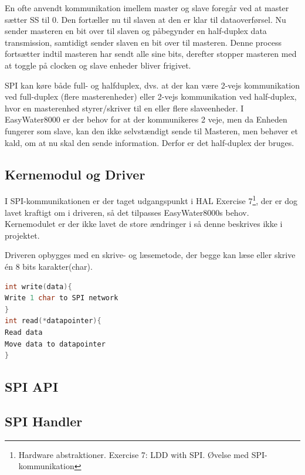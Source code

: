 En ofte anvendt kommunikation imellem master og slave foregår ved at master sætter SS til 0. Den fortæller nu til slaven at den er klar til 
dataoverførsel. Nu sender masteren en bit over til slaven og påbegynder en half-duplex data transmission, samtidigt sender slaven en bit over til masteren. Denne process fortsætter indtil masteren har sendt alle sine bits, derefter stopper masteren med at toggle på clocken og slave enheder bliver frigivet.

SPI kan køre både full- og halfduplex, dvs. at der kan være 2-vejs kommunikation ved full-duplex (flere masterenheder) eller 2-vejs kommunikation ved half-duplex, hvor en masterenhed styrer/skriver til en eller flere slaveenheder. I EasyWater8000 er der behov for at der kommunikeres 2 veje, men da Enheden fungerer som slave, kan den ikke selvstændigt sende til Masteren, men behøver et kald, om at nu skal den sende information. Derfor er det half-duplex der bruges.

\subsection{Kernemodul og Driver}

I SPI-kommunikationen er der taget udgangspunkt i HAL Exercise 7\footnote{Hardware abstraktioner. Exercise 7: LDD with SPI. Øvelse med SPI-kommunikation}, der er dog lavet kraftigt om i driveren, så det tilpasses EasyWater8000s behov. Kernemodulet er der ikke lavet de store ændringer i så denne beskrives ikke i projektet.

Driveren opbygges med en skrive- og læsemetode, der begge kan læse eller skrive én 8 bits karakter(char).

\begin{lstlisting}[language=C]
int write(data){
Write 1 char to SPI network
}
int read(*datapointer){
Read data
Move data to datapointer
}
\end{lstlisting}


\subsection{SPI API}




\subsection{SPI Handler}
